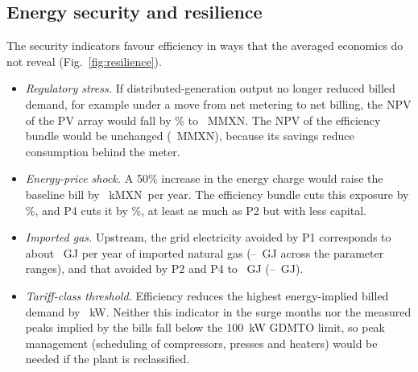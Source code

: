 \documentclass[preprint,12pt,authoryear]{elsarticle}
\newcommand{\MXN}{MXN}
\begin{document}
\subsection{Energy security and resilience}
\label{sec:resil}
The security indicators favour efficiency in ways that the averaged economics do not reveal (Fig.~\ref{fig:resilience}).
\begin{itemize}
\item \emph{Regulatory stress.} If distributed-generation output no longer reduced billed demand, for example under a move from net metering to net billing, the NPV of the PV array would fall by \nPVStressDrop\% to \nNPVPVStress~M\MXN. The NPV of the efficiency bundle would be unchanged (\nNPVEEStress~M\MXN), because its savings reduce consumption behind the meter.
\item \emph{Energy-price shock.} A 50\% increase in the energy charge would raise the baseline bill by \nShockZero~k\MXN\ per year. The efficiency bundle cuts this exposure by \nShockCutOne\%, and P4 cuts it by \nShockCutFour\%, at least as much as P2 but with less capital.
\item \emph{Imported gas.} Upstream, the grid electricity avoided by P1 corresponds to about \nGasOne~GJ per year of imported natural gas (\nGasOneLo--\nGasOneHi~GJ across the parameter ranges), and that avoided by P2 and P4 to \nGasTwo~GJ (\nGasTwoLo--\nGasTwoHi~GJ).
\item \emph{Tariff-class threshold.} Efficiency reduces the highest energy-implied billed demand by \nPeakCutOne~kW. Neither this indicator in the surge months nor the measured peaks implied by the bills fall below the 100~kW GDMTO limit, so peak management (scheduling of compressors, presses and heaters) would be needed if the plant is reclassified.
\end{itemize}
\end{document}
